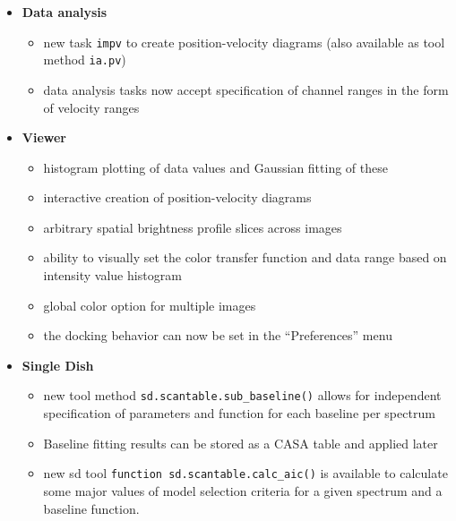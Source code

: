 \begin{itemize}
\item  {\bf Data analysis}
\begin{itemize}
   \item  new task {\tt impv} to create position-velocity diagrams (also available as tool method {\tt ia.pv})
   \item   data analysis tasks now accept specification of channel ranges
  in the form of velocity ranges
   
\end{itemize}


\item  {\bf Viewer}

\begin{itemize}
   \item  histogram plotting of data values and Gaussian fitting of these
   \item  interactive creation of position-velocity diagrams
   \item  arbitrary spatial brightness profile slices across images
   \item ability to visually set the color transfer function and data
     range based on intensity value histogram
   \item global color option for multiple images
   \item  the docking behavior can now be set in the ``Preferences'' menu

\end{itemize}

\item {\bf Single Dish}
\begin{itemize}


  
\item  new tool method {\tt sd.scantable.sub\_baseline()} allows for
  independent specification of parameters and function for each
  baseline per spectrum

  \item  Baseline fitting results can be stored as a CASA table and
  applied later

  \item  new sd tool {\tt function sd.scantable.calc\_aic()} is
  available to calculate some major values of model selection criteria
  for a given spectrum and a baseline function.
  

\end{itemize}
\end{itemize}
